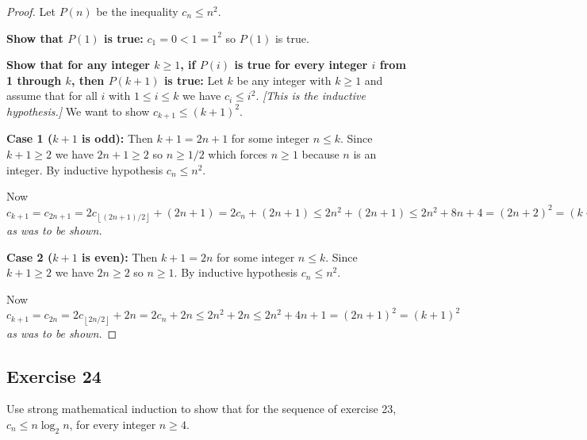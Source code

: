 \documentclass[14pt]{extarticle}
\newcommand{\floor}[1]{{\left\lfloor#1\right\rfloor}}
\begin{document}
\begin{proof}
Let \(P(n)\) be the inequality \(c_n \leq n^2\).

{\bf Show that \(P(1)\) is true:} \(c_1 = 0 < 1 = 1^2\) so \(P(1)\) is true.

{\bf Show that for any integer \(k \geq 1\), if \(P(i)\) is true for every integer \(i\) from 1 through \(k\), then 
\(P(k + 1)\) is true:} Let \(k\) be any integer with \(k \geq 1\) and assume that for all \(i\) with \(1 \leq i \leq k\) we
have \(c_i \leq i^2\). {\it [This is the inductive hypothesis.]} We want to show \(c_{k+1} \leq (k+1)^2\).

{\bf Case 1 (\(k+1\) is odd):} Then \(k+1 = 2n+1\) for some integer \(n\leq k\). Since \(k+1\geq2\) we have \(2n+1\geq 2\) 
so \(n \geq 1/2\) which forces \(n \geq 1\) because \(n\) is an integer. By inductive hypothesis \(c_n \leq n^2\).

Now \(c_{k+1} = c_{2n+1} = 2c_{\floor{(2n+1)/2}} + (2n+1) = 2c_n + (2n+1) \leq 2n^2 + (2n+1) \leq 2n^2 + 8n + 4 = (2n+2)^2 
= (k+1)^2\) {\it as was to be shown.}

{\bf Case 2 (\(k+1\) is even):} Then \(k+1 = 2n\) for some integer \(n\leq k\). Since \(k+1\geq2\) we have \(2n \geq 2\) 
so \(n \geq 1\). By inductive hypothesis \(c_n \leq n^2\).

Now \(c_{k+1} = c_{2n} = 2c_{\floor{2n/2}} + 2n = 2c_n + 2n \leq 2n^2 + 2n \leq 2n^2 + 4n + 1 = (2n+1)^2 = (k+1)^2\) 
{\it as was to be shown.}
\end{proof}

\subsection{Exercise 24}
Use strong mathematical induction to show that for the sequence of exercise 23,\(c_n \leq n \log_2 n\), for every 
integer \(n \geq 4\).
\end{document}
